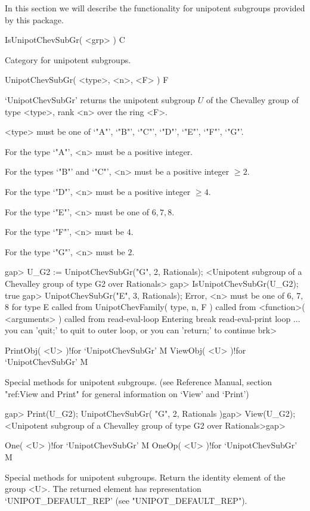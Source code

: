 In this section we will describe the functionality for unipotent
subgroups provided by this package.

\>IsUnipotChevSubGr( <grp> ) C

Category for unipotent subgroups.

\>UnipotChevSubGr( <type>, <n>, <F> ) F

`UnipotChevSubGr'  returns  the  unipotent  subgroup $U$ of the Chevalley
group of type <type>, rank <n> over the ring <F>.

<type> must be one of `"A"', `"B"', `"C"', `"D"', `"E"', `"F"', `"G"'.

For the type  `"A"', <n> must be a positive integer.

For the types `"B"' and `"C"', <n> must be a positive integer $\geq 2$.

For the type  `"D"', <n> must be a positive integer $\geq 4$.

For the type  `"E"', <n> must be one of $6, 7, 8$.

For the type  `"F"', <n> must be $4$.

For the type  `"G"', <n> must be $2$.


\beginexample
gap> U_G2 := UnipotChevSubGr("G", 2, Rationals);
<Unipotent subgroup of a Chevalley group of type G2 over Rationals>
gap> IsUnipotChevSubGr(U_G2);
true
\endexample
\begintt
gap> UnipotChevSubGr("E", 3, Rationals);
Error, <n> must be one of 6, 7, 8 for type E  called from
UnipotChevFamily( type, n, F ) called from
<function>( <arguments> ) called from read-eval-loop
Entering break read-eval-print loop ...
you can 'quit;' to quit to outer loop, or
you can 'return;' to continue
brk>
\endtt

\>PrintObj( <U> )!{for `UnipotChevSubGr'} M
\>ViewObj( <U> )!{for `UnipotChevSubGr'} M

Special methods for unipotent  subgroups.  (see  {\GAP} Reference Manual,
section  "ref:View  and  Print"  for general  information  on `View'  and
`Print')

\beginexample
gap> Print(U_G2);
UnipotChevSubGr( "G", 2, Rationals )gap> View(U_G2);
<Unipotent subgroup of a Chevalley group of type G2 over Rationals>gap>
\endexample

\>One( <U> )!{for `UnipotChevSubGr'} M
\>OneOp( <U> )!{for `UnipotChevSubGr'} M

Special  methods  for unipotent  subgroups. Return the  identity
element   of   the   group  <U>.   The   returned   element  has
representation `UNIPOT_DEFAULT_REP' (see "UNIPOT_DEFAULT_REP").


